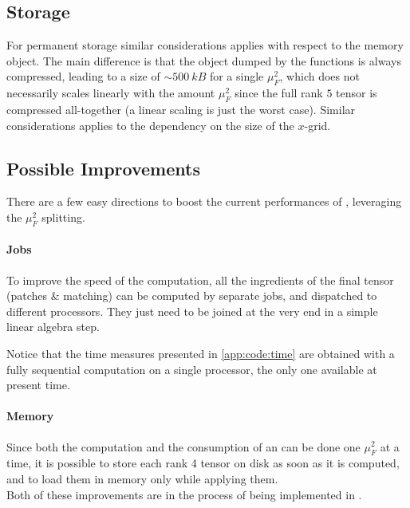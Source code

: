 \subsection{Storage}
\label{app:code:storage}

For permanent storage similar considerations applies with respect to the
memory object.
The main difference is that the object dumped by the \eko{} functions is always
compressed, leading to a size of $\sim \SI{500}{kB}$ for a single $\mu_F^2$,
which does not necessarily scales linearly with the amount $\mu_F^2$ since the
full rank $5$ tensor is compressed all-together (a linear scaling is just
the worst case).
Similar considerations applies to the dependency on the size of the $x$-grid.

\subsection{Possible Improvements}

There are a few easy directions to boost the current performances
of \eko{}, leveraging the $\mu_F^2$ splitting.

\paragraph{Jobs} To improve the speed of the computation, all the ingredients
of the final tensor (patches \& matching) can be computed by separate jobs, and
dispatched to different processors.
They just need to be joined at the very end in a simple linear algebra step.

Notice that the time measures presented in \cref{app:code:time} are obtained
with a fully sequential computation on a single processor, the only one
available at present time.

\paragraph{Memory} Since both the computation and the consumption of an \eko{}
can be done one $\mu_F^2$ at a time, it is possible to store each rank 4 tensor
on disk as soon as it is computed, and to load them in memory only while
applying them.\\

Both of these improvements are in the process of being implemented in \eko{}.
